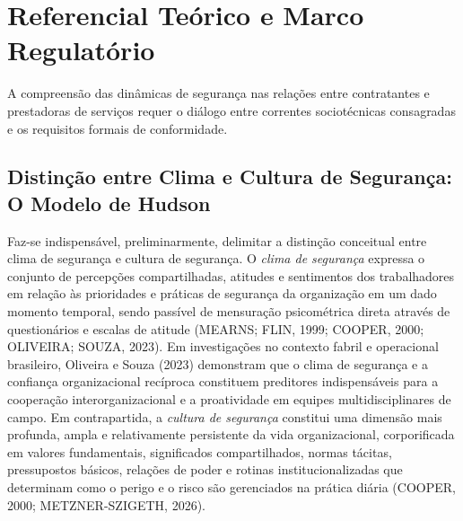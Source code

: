 \documentclass[12pt,a4paper]{article}
\begin{document}
\section{Referencial Teórico e Marco Regulatório}

A compreensão das dinâmicas de segurança nas relações entre contratantes e prestadoras de serviços requer o diálogo entre correntes sociotécnicas consagradas e os requisitos formais de conformidade.

\subsection{Distinção entre Clima e Cultura de Segurança: O Modelo de Hudson}

Faz-se indispensável, preliminarmente, delimitar a distinção conceitual entre clima de segurança e cultura de segurança. O \textit{clima de segurança} expressa o conjunto de percepções compartilhadas, atitudes e sentimentos dos trabalhadores em relação às prioridades e práticas de segurança da organização em um dado momento temporal, sendo passível de mensuração psicométrica direta através de questionários e escalas de atitude (MEARNS; FLIN, 1999; COOPER, 2000; OLIVEIRA; SOUZA, 2023). Em investigações no contexto fabril e operacional brasileiro, Oliveira e Souza (2023) demonstram que o clima de segurança e a confiança organizacional recíproca constituem preditores indispensáveis para a cooperação interorganizacional e a proatividade em equipes multidisciplinares de campo. Em contrapartida, a \textit{cultura de segurança} constitui uma dimensão mais profunda, ampla e relativamente persistente da vida organizacional, corporificada em valores fundamentais, significados compartilhados, normas tácitas, pressupostos básicos, relações de poder e rotinas institucionalizadas que determinam como o perigo e o risco são gerenciados na prática diária (COOPER, 2000; METZNER-SZIGETH, 2026).
\end{document}
